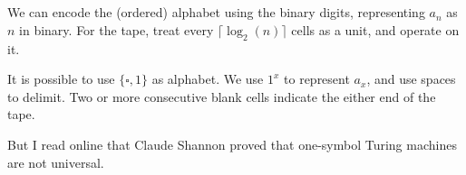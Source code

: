 \documentclass{article}
\theoremstyle{plain}
\begin{document}
\section{}
\subsubsection{}
We can encode the (ordered) alphabet using the binary digits, representing
$a_{n}$ as $n$ in binary. For the tape, treat every $\lceil\log_{2}(n)\rceil$ cells as a
unit, and operate on it.

\medskip It is possible to use $\{\square,1\}$ as alphabet. We use $1^{x}$ to
represent $a_{x}$, and use spaces to delimit. Two or more consecutive blank
cells indicate the either end of the tape.

\medskip But I read online that Claude Shannon proved that one-symbol Turing
machines are not universal.

\section{}
\end{document}
